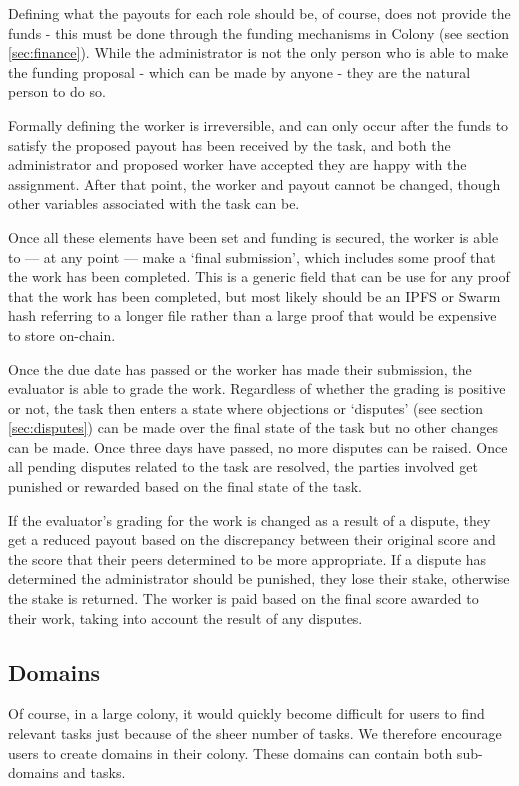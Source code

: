 Defining what the payouts for each role should be, of course, does not provide the funds - this must be done through the funding mechanisms in Colony (see section \ref{sec:finance}). While the administrator is not the only person who is able to make the funding proposal - which can be made by anyone - they are the natural person to do so.

Formally defining the worker is irreversible, and can only occur after the funds to satisfy the proposed payout has been received by the task, and both the administrator and proposed worker have accepted they are happy with the assignment. After that point, the worker and payout cannot be changed, though other variables associated with the task can be.

Once all these elements have been set and funding is secured, the worker is able to --- at any point --- make a `final submission', which includes some proof that the work has been completed. This is a generic field that can be use for any proof that the work has been completed, but most likely should be an IPFS or Swarm hash referring to a longer file rather than a large proof that would be expensive to store on-chain.

Once the due date has passed or the worker has made their submission, the evaluator is able to grade the work. Regardless of whether the grading is positive or not, the task then enters a state where objections or `disputes' (see section \ref{sec:disputes}) can be made over the final state of the task but no other changes can be made. Once three days have passed, no more disputes can be raised. Once all pending disputes related to the task are resolved, the parties involved get punished or rewarded based on the final state of the task.

If the evaluator’s grading for the work is changed as a result of a dispute, they get a reduced payout based on the discrepancy between their original score and the score that their peers determined to be more appropriate. If a dispute has determined the administrator should be punished, they lose their stake, otherwise the stake is returned. The worker is paid based on the final score awarded to their work, taking into account the result of any disputes.

\subsection{Domains}\label{sec:domains}

Of course, in a large colony, it would quickly become difficult for users to find relevant tasks just because of the sheer number of tasks. We therefore encourage users to create domains in their colony. These domains can contain both sub-domains and tasks. 

